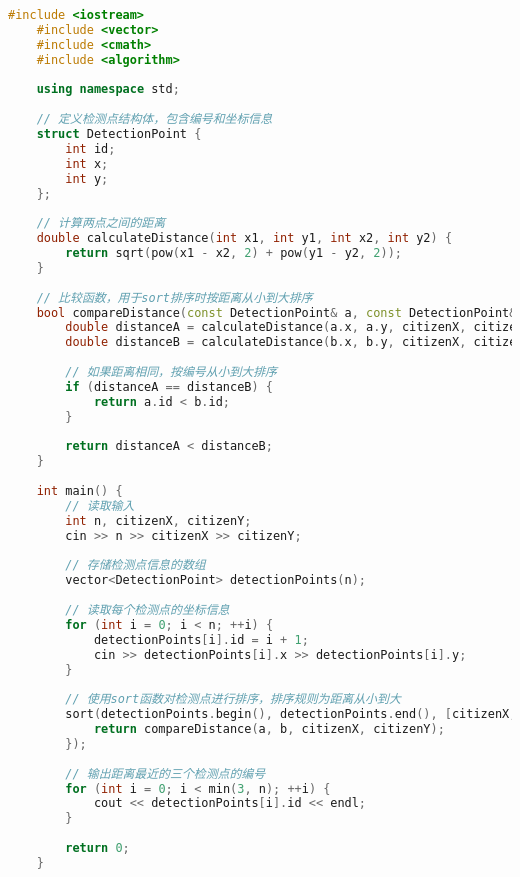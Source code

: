 \begin{lstlisting}[language=C++]
    #include <iostream>
    #include <vector>
    #include <cmath>
    #include <algorithm>
    
    using namespace std;
    
    // 定义检测点结构体，包含编号和坐标信息
    struct DetectionPoint {
        int id;
        int x;
        int y;
    };
    
    // 计算两点之间的距离
    double calculateDistance(int x1, int y1, int x2, int y2) {
        return sqrt(pow(x1 - x2, 2) + pow(y1 - y2, 2));
    }
    
    // 比较函数，用于sort排序时按距离从小到大排序
    bool compareDistance(const DetectionPoint& a, const DetectionPoint& b, int citizenX, int citizenY) {
        double distanceA = calculateDistance(a.x, a.y, citizenX, citizenY);
        double distanceB = calculateDistance(b.x, b.y, citizenX, citizenY);
    
        // 如果距离相同，按编号从小到大排序
        if (distanceA == distanceB) {
            return a.id < b.id;
        }
    
        return distanceA < distanceB;
    }
    
    int main() {
        // 读取输入
        int n, citizenX, citizenY;
        cin >> n >> citizenX >> citizenY;
    
        // 存储检测点信息的数组
        vector<DetectionPoint> detectionPoints(n);
    
        // 读取每个检测点的坐标信息
        for (int i = 0; i < n; ++i) {
            detectionPoints[i].id = i + 1;
            cin >> detectionPoints[i].x >> detectionPoints[i].y;
        }
    
        // 使用sort函数对检测点进行排序，排序规则为距离从小到大
        sort(detectionPoints.begin(), detectionPoints.end(), [citizenX, citizenY](const DetectionPoint& a, const DetectionPoint& b) {
            return compareDistance(a, b, citizenX, citizenY);
        });
    
        // 输出距离最近的三个检测点的编号
        for (int i = 0; i < min(3, n); ++i) {
            cout << detectionPoints[i].id << endl;
        }
    
        return 0;
    }    
\end{lstlisting}